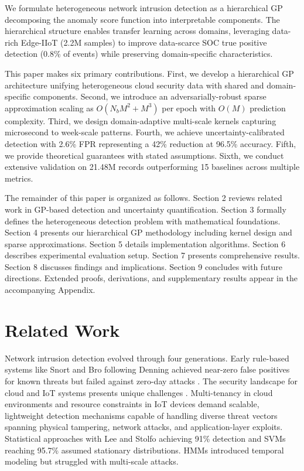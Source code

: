 \documentclass[review,12pt]{elsarticle}
\begin{document}
We formulate heterogeneous network intrusion detection as a hierarchical GP decomposing the anomaly score function into interpretable components. The hierarchical structure enables transfer learning across domains, leveraging data-rich Edge-IIoT (2.2M samples) to improve data-scarce SOC true positive detection (0.8\% of events) while preserving domain-specific characteristics.

This paper makes six primary contributions. First, we develop a hierarchical GP architecture unifying heterogeneous cloud security data with shared and domain-specific components. Second, we introduce an adversarially-robust sparse approximation scaling as $O(N_b M^2 + M^3)$ per epoch with $O(M)$ prediction complexity. Third, we design domain-adaptive multi-scale kernels capturing microsecond to week-scale patterns. Fourth, we achieve uncertainty-calibrated detection with 2.6\% FPR representing a 42\% reduction at 96.5\% accuracy. Fifth, we provide theoretical guarantees with stated assumptions. Sixth, we conduct extensive validation on 21.48M records outperforming 15 baselines across multiple metrics.

The remainder of this paper is organized as follows. Section 2 reviews related work in GP-based detection and uncertainty quantification. Section 3 formally defines the heterogeneous detection problem with mathematical foundations. Section 4 presents our hierarchical GP methodology including kernel design and sparse approximations. Section 5 details implementation algorithms. Section 6 describes experimental evaluation setup. Section 7 presents comprehensive results. Section 8 discusses findings and implications. Section 9 concludes with future directions. Extended proofs, derivations, and supplementary results appear in the accompanying Appendix.

\section{Related Work}

Network intrusion detection evolved through four generations. Early rule-based systems like Snort \cite{roesch1999snort} and Bro \cite{paxson1999bro} following Denning \cite{denning1987intrusion} achieved near-zero false positives for known threats but failed against zero-day attacks \cite{moore2003inside}. The security landscape for cloud and IoT systems presents unique challenges \cite{hasan2020comprehensive,kamble2020survey}. Multi-tenancy in cloud environments and resource constraints in IoT devices demand scalable, lightweight detection mechanisms capable of handling diverse threat vectors spanning physical tampering, network attacks, and application-layer exploits. Statistical approaches with Lee and Stolfo \cite{lee2000framework} achieving 91\% detection and SVMs \cite{mukkamala2005intrusion} reaching 95.7\% assumed stationary distributions. HMMs \cite{ourston2003applications} introduced temporal modeling but struggled with multi-scale attacks.
\end{document}
